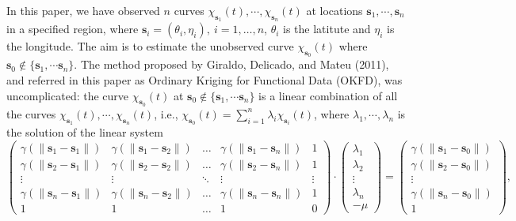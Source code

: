 \documentclass[
  12pt,
]{article}
\theoremstyle{definition}
\theoremstyle{definition}
\theoremstyle{definition}
\theoremstyle{remark}
\begin{document}
In this paper, we have observed \(n\) curves \(\chi_{\bm{s}_1}(t), \cdots, \chi_{\bm{s}_n}(t)\) at locations \(\bm{s}_1, \cdots, \bm{s}_n\) in a specified region,
where \(\bm{s}_i = (\theta_i, \eta_i), \ i =1, \dots, n\), \(\theta_i\) is the latitute and \(\eta_i\) is the longitude. The aim is to estimate the unobserved curve
\(\chi_{\bm{s}_0}(t)\) where \(\bm{s}_0 \not\in \{\bm{s}_1, \cdots \bm{s}_n \}\). The method proposed by Giraldo, Delicado, and Mateu (2011), and referred in this paper as Ordinary Kriging for Functional Data (OKFD), was uncomplicated:
the curve \(\chi_{\bm{s}_0}(t)\) at \(\bm{s}_0 \not\in \{\bm{s}_1, \cdots \bm{s}_n \}\) is a linear combination of all the curves \(\chi_{\bm{s}_1}(t), \cdots, \chi_{\bm{s}_n}(t)\), i.e.,
\(\chi_{\bm{s}_0}(t) = \sum_{i=1}^{n} \lambda_i \chi_{\bm{s}_i}(t)\), where \(\lambda_1, \cdots, \lambda_n\) is the solution of the linear system
\begin{equation*}
    \begin{pmatrix}
    \gamma(\lVert\bm{s}_1 - \bm{s}_1\rVert) & \gamma(\lVert\bm{s}_1 - \bm{s}_2\rVert) & \dots & \gamma(\lVert\bm{s}_{1} - \bm{s}_n\rVert) & 1\\
    \gamma(\lVert\bm{s}_2 - \bm{s}_1\rVert) & \gamma(\lVert\bm{s}_2 - \bm{s}_2\rVert) & \dots & \gamma(\lVert\bm{s}_{2} - \bm{s}_n\rVert) & 1\\
    \vdots & \vdots & \ddots & \vdots &\vdots\\
    \gamma(\lVert\bm{s}_{n} - \bm{s}_1\rVert) & \gamma(\lVert\bm{s}_{n} - \bm{s}_2\rVert) & \dots & \gamma(\lVert\bm{s}_{n} - \bm{s}_{n}\rVert) & 1\\
    1 & 1 & \dots & 1 & 0
    \end{pmatrix}
    \cdot
    \begin{pmatrix}
    \lambda_1\\
    \lambda_2\\
    \vdots\\
    \lambda_{n}\\
    -\mu
    \end{pmatrix}
    =
    \begin{pmatrix}
    \gamma(\lVert\bm{s}_1 - \bm{s}_0\rVert)\\
    \gamma(\lVert\bm{s}_2 - \bm{s}_0\rVert)\\
    \vdots\\
    \gamma(\lVert\bm{s}_{n}- \bm{s}_0\rVert)\\
    1
    \end{pmatrix},
\end{equation*}
\end{document}
